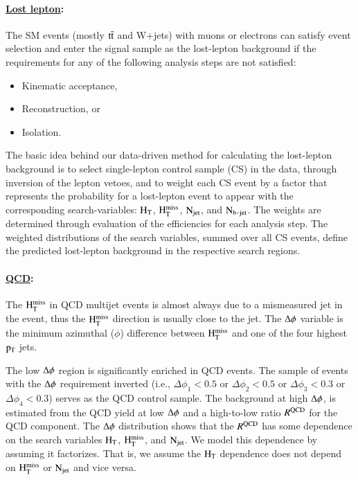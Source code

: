 \paragraph{\underline{Lost lepton}: }
The SM events (mostly $\rm t\bar{t}$ and W+jets) with muons or electrons
can satisfy event selection and enter the signal sample as the lost-lepton background
if the requirements for any of the following analysis steps are not satisfied:

\begin{itemize}
\item Kinematic acceptance,
\item Reconstruction, or
\item Isolation.
\end{itemize}
The basic idea behind our data-driven method for calculating
the lost-lepton background is to select
single-lepton control sample (CS) in the data,
through inversion of the lepton vetoes,
and to weight each CS event
by a factor that represents the probability for a lost-lepton event
to appear with
the corresponding search-variables: $\rm H_{T}$, $\rm H_{T}^{miss}$, $\rm N_{jet}$, and $\rm N_{b\texttt{-}jet}$.
The weights are determined through evaluation of the efficiencies
for each analysis step.
The weighted distributions of the search variables,
summed over all CS events,
define the predicted lost-lepton background in the respective search regions.
\paragraph{\underline{QCD}: }
The $\rm H_{T}^{miss}$ in QCD multijet events is almost always due to a mismeasured jet in the event,
       thus the $\rm H_{T}^{miss}$ direction is usually close to the jet.
       The $\rm \Delta \phi$ variable is the minimum azimuthal ($\phi$) difference between $\rm H_{T}^{miss}$ and one of the four
       highest $\rm p_{T}$ jets.


       The low $\rm \Delta \phi$ region is significantly enriched in QCD events.
       The sample of events with the $\rm \Delta \phi$ requirement inverted
       (i.e., $\Delta \phi_1<0.5$ or $\Delta \phi_2<0.5$ or $\Delta \phi_3<0.3$ or $\Delta \phi_4<0.3$)
       serves as the QCD control sample.
       The background at high $\rm \Delta \phi$, is estimated from the QCD yield at low
       $\rm \Delta \phi$ and a high-to-low ratio $R^{\rm QCD}$ for the QCD component.
       The $\rm \Delta \phi$ distribution  shows that the $R^{\rm QCD}$
       has some dependence on the search variables $\rm H_{T}$, $\rm H_{T}^{miss}$, and $\rm N_{jet}$.
       We model this dependence by assuming it factorizes.  That is, we assume the $\rm H_{T}$
       dependence does not depend on $\rm H_{T}^{miss}$ or $\rm N_{jet}$ and vice versa.
